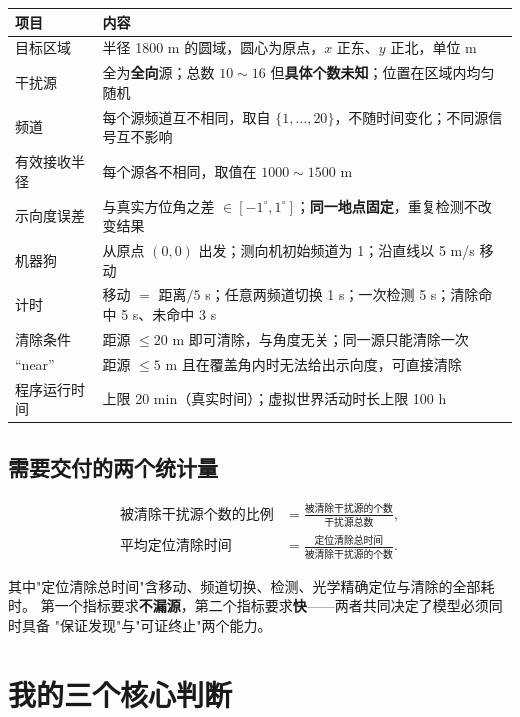 \begin{longtable}{p{3.4cm}p{11.4cm}}
\toprule
项目 & 内容 \\ \midrule
\endhead
目标区域 & 半径 1800 m 的圆域，圆心为原点，$x$ 正东、$y$ 正北，单位 m \\
干扰源 & 全为\textbf{全向}源；总数 $10\sim16$ 但\textbf{具体个数未知}；位置在区域内均匀随机 \\
频道 & 每个源频道互不相同，取自 $\{1,\dots,20\}$，不随时间变化；不同源信号互不影响 \\
有效接收半径 & 每个源各不相同，取值在 $1000\sim1500$ m \\
示向度误差 & 与真实方位角之差 $\in[-1^{\circ},1^{\circ}]$；\textbf{同一地点固定}，重复检测不改变结果 \\
机器狗 & 从原点 $(0,0)$ 出发；测向机初始频道为 1；沿直线以 5 m/s 移动 \\
计时 & 移动 $=$ 距离$/5$ s；任意两频道切换 1 s；一次检测 5 s；清除命中 5 s、未命中 3 s \\
清除条件 & 距源 $\le20$ m 即可清除，与角度无关；同一源只能清除一次 \\
“near” & 距源 $\le5$ m 且在覆盖角内时无法给出示向度，可直接清除 \\
程序运行时间 & 上限 20 min（真实时间）；虚拟世界活动时长上限 100 h \\
\bottomrule
\end{longtable}

\subsection{需要交付的两个统计量}

\begin{equation}
\begin{aligned}
\text{被清除干扰源个数的比例}&=\frac{\text{被清除干扰源的个数}}{\text{干扰源总数}},\\[2pt]
\text{平均定位清除时间}&=\frac{\text{定位清除总时间}}{\text{被清除干扰源的个数}} .
\end{aligned}
\end{equation}

其中"定位清除总时间"含移动、频道切换、检测、光学精确定位与清除的全部耗时。
第一个指标要求\textbf{不漏源}，第二个指标要求\textbf{快}——两者共同决定了模型必须同时具备
"保证发现"与"可证终止"两个能力。

\section{我的三个核心判断}

